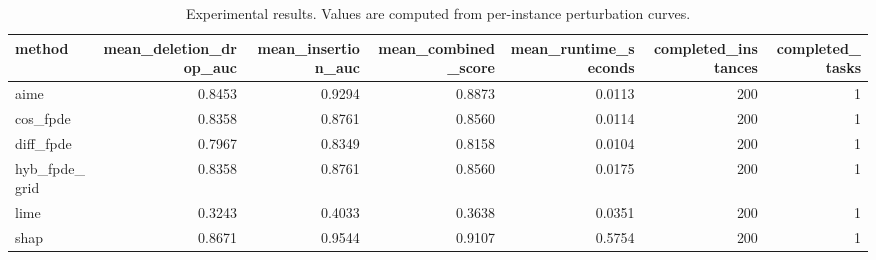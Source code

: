 \begin{table}[t]
\caption{Experimental results. Values are computed from per-instance perturbation curves.}
\label{tab:main_results_computed}
\centering
\begin{tabular}{lrrrrrr}
\toprule
method & mean\_deletion\_drop\_auc & mean\_insertion\_auc & mean\_combined\_score & mean\_runtime\_seconds & completed\_instances & completed\_tasks \\
\midrule
aime & 0.8453 & 0.9294 & 0.8873 & 0.0113 & 200 & 1 \\
cos\_fpde & 0.8358 & 0.8761 & 0.8560 & 0.0114 & 200 & 1 \\
diff\_fpde & 0.7967 & 0.8349 & 0.8158 & 0.0104 & 200 & 1 \\
hyb\_fpde\_grid & 0.8358 & 0.8761 & 0.8560 & 0.0175 & 200 & 1 \\
lime & 0.3243 & 0.4033 & 0.3638 & 0.0351 & 200 & 1 \\
shap & 0.8671 & 0.9544 & 0.9107 & 0.5754 & 200 & 1 \\
\bottomrule
\end{tabular}

\end{table}
